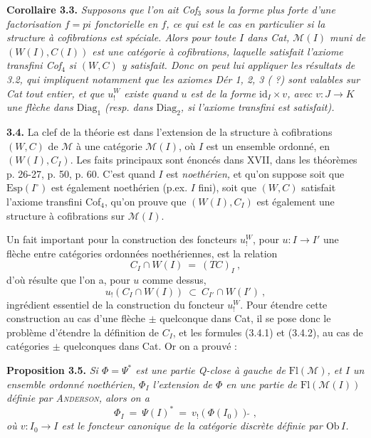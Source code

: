 \documentclass[11pt]{article}
\newcommand{\msp}[1]{\marginpar{\footnotesize [#1]}}
\newcommand{\M}{\mathcal{M}}
\newcommand{\Fl}{\mathrm{Fl}}
\newcommand{\Diag}{\mathrm{Diag}}
\newcommand{\id}{\mathrm{id}}
\newcommand{\Qs}{\tilde{\ }}
\begin{document}
\textbf{Corollaire 3.3.} \textit{Supposons que l'on ait Cof$_3$ sous la forme plus forte d'une factorisation
\msp{page 37}
$f=pi$ \textup{fonctorielle} en $f$, ce qui est le cas en particulier si la structure à cofibrations est spéciale. Alors pour toute $I$ dans \textup{Cat}, $\M(I)$ muni de $(W(I),C(I))$ est une catégorie à cofibrations, laquelle satisfait l'axiome transfini Cof$_4$ si $(W,C)$ y satisfait. Donc on peut lui appliquer les résultats de \textup{3.2}, qui impliquent notamment que les axiomes Dér 1, 2, 3 ( ?) sont valables sur \textup{Cat} tout entier, et que $u^{W}_{!}$ existe quand $u$ est de la forme $\id_I\times v$, avec $v : J\longrightarrow K$ une flèche dans \textup{$\Diag_1$} (resp. dans \textup{$\Diag_2$}, si l'axiome transfini est satisfait).}

\textbf{3.4.} La clef de la théorie est dans l'extension de la structure à cofibrations $(W,C)$ de $\M$ à une catégorie $\M(I)$, où $I$ est un ensemble ordonné, en $(W(I),C_I)$. Les faits principaux sont énoncés dans XVII, dans les théorèmes p. 26-27, p. 50, p. 60. C'est quand $I$ est \textit{noethérien,} et qu'on suppose soit que $\mathrm{Esp}(I^{\circ})$ est également noethérien (p.ex. $I$ fini), soit que $(W,C)$ satisfait l'axiome transfini Cof$_4$, qu'on prouve que $(W(I),C_I)$ est également une structure à cofibrations sur $\M(I)$.

\msp{page 38}
Un fait important pour la construction des foncteurs $u^{W}_{!}$, pour $u : I\longrightarrow I'$ une flèche entre catégories ordonnées noethériennes, est la relation
\[
C_I\cap W(I) \ = \ (TC)_I \ , \tag*{(3.4.1)}
\]
d'où résulte que l'on a, pour $u$ comme dessus,
\[
u_!(C_I\cap W(I)) \ \subset\ C_{I'}\cap W(I') \ , \tag*{(3.4.2)}
\]
ingrédient essentiel de la construction du foncteur $u^{W}_{!}$. Pour étendre cette construction au cas d'une flèche $\pm$ quelconque dans Cat, il se pose donc le problème d'étendre la définition de $C_I$, et les formules (3.4.1) et (3.4.2), au cas de catégories $\pm$ quelconques dans Cat. Or on a prouvé :

\textbf{Proposition 3.5.} \textit{Si $\Phi=\Psi^*$ est une partie \textup{Q-close} à gauche de \textup{$\Fl(\M)$}, et $I$ un ensemble ordonné noethérien, $\Phi_I$ l'extension de $\Phi$ en une partie de \textup{$\Fl(\M(I))$} définie par \textup{\textsc{Anderson}}, alors on a}
\[
\Phi_I \ = \ \Psi(I)^* \ = \ v_!(\Phi(I_0))\Qs \ , \tag*{(3.5.1)}
\]
\textit{où $v : I_0\longrightarrow I$ est le foncteur canonique de la catégorie discrète définie par \textup{$\mathrm{Ob}\,I$}.}
\end{document}
